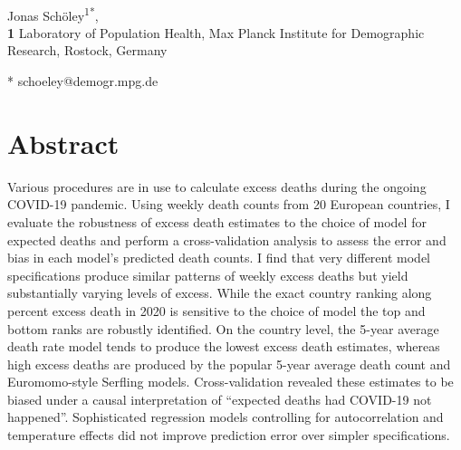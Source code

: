 \documentclass[10pt,letterpaper]{article}
\begin{document}
\vspace*{0.2in}

\begin{flushleft}
{\Large
\textbf{} %
}
\newline
\\
Jonas Schöley\textsuperscript{1*},
\\
\bigskip
\textbf{1} Laboratory of Population Health, Max Planck Institute for Demographic Research, Rostock, Germany
\bigskip

* schoeley@demogr.mpg.de

\end{flushleft}
\section*{Abstract}
Various procedures are in use to calculate excess deaths during the ongoing COVID-19 pandemic. Using weekly death counts from 20 European countries, I evaluate the robustness of excess death estimates to the choice of model for expected deaths and perform a cross-validation analysis to assess the error and bias in each model's predicted death counts. I find that very different model specifications produce similar patterns of weekly excess deaths but yield substantially varying levels of excess. While the exact country ranking along percent excess death in 2020 is sensitive to the choice of model the top and bottom ranks are robustly identified. On the country level, the 5-year average death rate model tends to produce the lowest excess death estimates, whereas high excess deaths are produced by the popular 5-year average death count and Euromomo-style Serfling models. Cross-validation revealed these estimates to be biased under a causal interpretation of ``expected deaths had COVID-19 not happened''. Sophisticated regression models controlling for autocorrelation and temperature effects did not improve prediction error over simpler specifications.
\end{document}
